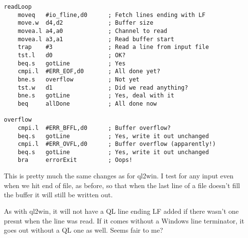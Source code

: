 \begin{lstlisting}[showstringspaces=false,tabsize=4]
readLoop
    moveq   #io_fline,d0      ; Fetch lines ending with LF
    move.w  d4,d2             ; Buffer size
    movea.l a4,a0             ; Channel to read
    movea.l a3,a1             ; Read buffer start
    trap    #3                ; Read a line from input file
    tst.l   d0                ; OK?
    beq.s   gotLine           ; Yes
    cmpi.l  #ERR_EOF,d0       ; All done yet?
    bne.s   overflow          ; Not yet
    tst.w   d1                ; Did we read anything?
    bne.s   gotLine           ; Yes, deal with it
    beq     allDone           ; All done now

overflow
    cmpi.l  #ERR_BFFL,d0      ; Buffer overflow?
    beq.s   gotLine           ; Yes, write it out unchanged
    cmpi.l  #ERR_OVFL,d0      ; Buffer overflow (apparently!)
    beq.s   gotLine           ; Yes, write it out unchanged   
    bra     errorExit         ; Oops!
\end{lstlisting}

This is pretty much the same changes as for ql2win. I test for any
input even when we hit end of file, as before, so that when the last
line of a file doesn't fill the buffer it will still be written out.

As with ql2win, it will not have a QL line ending LF added if there
wasn't one presnt when the line was read. If it comes without a Windows
line terminator, it goes out without a QL one as well. Seems fair
to me?
